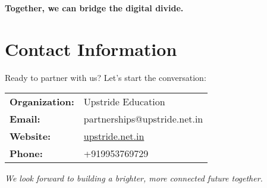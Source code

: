 \documentclass[12pt,a4paper]{article}
\begin{document}
\vspace{1cm}

\begin{center}
    \textcolor{upstrideblue}{\textbf{\Large Together, we can bridge the digital divide.}}
\end{center}

\section{Contact Information}

Ready to partner with us? Let's start the conversation:

\vspace{0.5cm}

\begin{tabular}{ll}
    \textbf{Organization:} & Upstride Education \\[0.3cm]
    \textbf{Email:} & partnerships@upstride.net.in \\[0.3cm]
    \textbf{Website:} & \href{https://upstride.net.in}{upstride.net.in} \\[0.3cm]
    \textbf{Phone:} & +919953769729 \\[0.3cm]
\end{tabular}

\vspace{1cm}

\textit{We look forward to building a brighter, more connected future together.}
\end{document}
